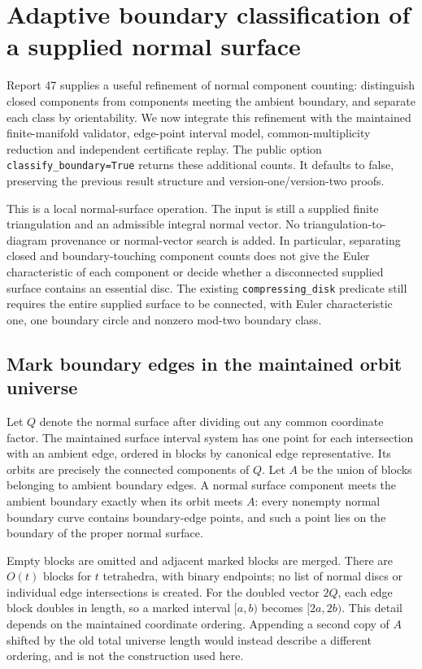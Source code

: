 \section{Adaptive boundary classification of a supplied normal surface}
\label{sec:normal-boundary}

Report 47 supplies a useful refinement of normal component counting:
distinguish closed components from components meeting the ambient boundary,
and separate each class by orientability. We now integrate this refinement
with the maintained finite-manifold validator, edge-point interval model,
common-multiplicity reduction and independent certificate replay. The
public option \texttt{classify\_boundary=True} returns these additional
counts. It defaults to false, preserving the previous result structure and
version-one/version-two proofs.

This is a local normal-surface operation. The input is still a supplied
finite triangulation and an admissible integral normal vector. No
triangulation-to-diagram provenance or normal-vector search is added.
In particular, separating closed and boundary-touching component counts
does not give the Euler characteristic of each component or decide whether
a disconnected supplied surface contains an essential disc. The existing
\texttt{compressing\_disk} predicate still requires the entire supplied
surface to be connected, with Euler characteristic one, one boundary
circle and nonzero mod-two boundary class.

\subsection{Mark boundary edges in the maintained orbit universe}

Let $Q$ denote the normal surface after dividing out any common coordinate
factor. The maintained surface interval system has one point for each
intersection with an ambient edge, ordered in blocks by canonical edge
representative. Its orbits are precisely the connected components of $Q$.
Let $A$ be the union of blocks belonging to ambient boundary edges. A normal
surface component meets the ambient boundary exactly when its orbit meets
$A$: every nonempty normal boundary curve contains boundary-edge points,
and such a point lies on the boundary of the proper normal surface.

Empty blocks are omitted and adjacent marked blocks are merged. There are
$O(t)$ blocks for $t$ tetrahedra, with binary endpoints; no list of normal
discs or individual edge intersections is created. For the doubled vector
$2Q$, each edge block doubles in length, so a marked interval $[a,b)$ becomes
$[2a,2b)$. This detail depends on the maintained coordinate ordering.
Appending a second copy of $A$ shifted by the old total universe length
would instead describe a different ordering, and is not the construction
used here.

